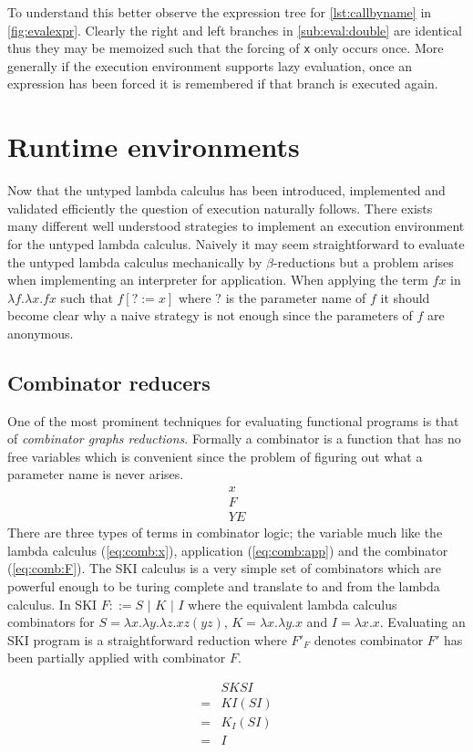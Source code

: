 \documentclass[11pt,oneside,a4paper]{report}
\begin{document}
To understand this better observe the expression tree for \autoref{lst:callbyname} in \autoref{fig:evalexpr}.
Clearly the right and left branches in \autoref{sub:eval:double} are identical thus they may be memoized such that the forcing of \texttt{x} only occurs once.
More generally if the execution environment supports lazy evaluation, once an expression has been forced it is remembered if that branch is executed again.

\section{Runtime environments}
Now that the untyped lambda calculus has been introduced, implemented and validated efficiently the question of execution naturally follows.
There exists many different well understood strategies to implement an execution environment for the untyped lambda calculus.
Naively it may seem straightforward to evaluate the untyped lambda calculus mechanically by $\beta$-reductions but a problem arises when implementing an interpreter for application.
When applying the term $f x$ in $\lambda f . \lambda x . f x$ such that $f[? := x]$ where $?$ is the parameter name of $f$ it should become clear why a naive strategy is not enough since the parameters of $f$ are anonymous.

\subsection{Combinator reducers}
One of the most prominent techniques for evaluating functional programs is that of \textit{combinator graphs reductions}.
Formally a combinator is a function that has no free variables which is convenient since the problem of figuring out what a parameter name is never arises.
\begin{align}
    x \label{eq:comb:x}\\
    F \label{eq:comb:F}\\
    Y E \label{eq:comb:app}
\end{align}
There are three types of terms in combinator logic; the variable much like the lambda calculus (\autoref{eq:comb:x}), application (\autoref{eq:comb:app}) and the combinator (\autoref{eq:comb:F}).
The SKI calculus is a very simple set of combinators which are powerful enough to be turing complete and translate to and from the lambda calculus.
In SKI $F ::= S \,\,|\,\, K \,\,|\,\, I$ where the equivalent lambda calculus combinators for $S = \lambda x . \lambda y . \lambda z . x z (y z)$, $K = \lambda x . \lambda y . x$ and $I = \lambda x . x$.
Evaluating an SKI program is a straightforward reduction where $F'_F$ denotes combinator $F'$ has been partially applied with combinator $F$.
\begin{exmp}
    \begin{align}
        &SKSI\\
        = &KI(SI)\tag*{}\\
        = &K_I(SI)\tag*{}\\
        = &I\tag*{}
    \end{align}
\end{exmp}
\end{document}
